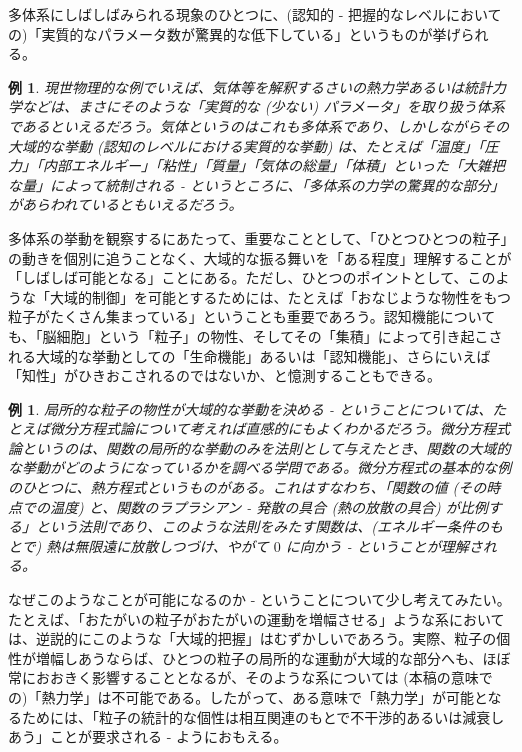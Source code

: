 \documentclass{jsarticle}
\theoremstyle{break}
\newtheorem{ex}[thm]{例}
\begin{document}
多体系にしばしばみられる現象のひとつに、(認知的 - 把握的なレベルにおいての)「実質的なパラメータ数が驚異的な低下している」というものが挙げられる。

\begin{ex}
現世物理的な例でいえば、気体等を解釈するさいの熱力学あるいは統計力学などは、まさにそのような「実質的な (少ない) パラメータ」を取り扱う体系であるといえるだろう。気体というのはこれも多体系であり、しかしながらその大域的な挙動 (認知のレベルにおける実質的な挙動) は、たとえば「温度」「圧力」「内部エネルギー」「粘性」「質量」「気体の総量」「体積」といった「大雑把な量」によって統制される - というところに、「多体系の力学の驚異的な部分」があらわれているともいえるだろう。
\end{ex}

多体系の挙動を観察するにあたって、重要なこととして、「ひとつひとつの粒子」の動きを個別に追うことなく、大域的な振る舞いを「ある程度」理解することが「しばしば可能となる」ことにある。ただし、ひとつのポイントとして、このような「大域的制御」を可能とするためには、たとえば「おなじような物性をもつ粒子がたくさん集まっている」ということも重要であろう。認知機能についても、「脳細胞」という「粒子」の物性、そしてその「集積」によって引き起こされる大域的な挙動としての「生命機能」あるいは「認知機能」、さらにいえば「知性」がひきおこされるのではないか、と憶測することもできる。

\begin{ex}
局所的な粒子の物性が大域的な挙動を決める - ということについては、たとえば微分方程式論について考えれば直感的にもよくわかるだろう。微分方程式論というのは、関数の局所的な挙動のみを法則として与えたとき、関数の大域的な挙動がどのようになっているかを調べる学問である。微分方程式の基本的な例のひとつに、熱方程式というものがある。これはすなわち、「関数の値 (その時点での温度) と、関数のラプラシアン - 発散の具合 (熱の放散の具合) が比例する」という法則であり、このような法則をみたす関数は、(エネルギー条件のもとで) 熱は無限遠に放散しつづけ、やがて $0$ に向かう - ということが理解される。
\end{ex}

なぜこのようなことが可能になるのか - ということについて少し考えてみたい。たとえば、「おたがいの粒子がおたがいの運動を増幅させる」ような系においては、逆説的にこのような「大域的把握」はむずかしいであろう。実際、粒子の個性が増幅しあうならば、ひとつの粒子の局所的な運動が大域的な部分へも、ほぼ常におおきく影響することとなるが、そのような系については (本稿の意味での)「熱力学」は不可能である。したがって、ある意味で「熱力学」が可能となるためには、「粒子の統計的な個性は相互関連のもとで不干渉的あるいは減衰しあう」ことが要求される - ようにおもえる。
\end{document}

